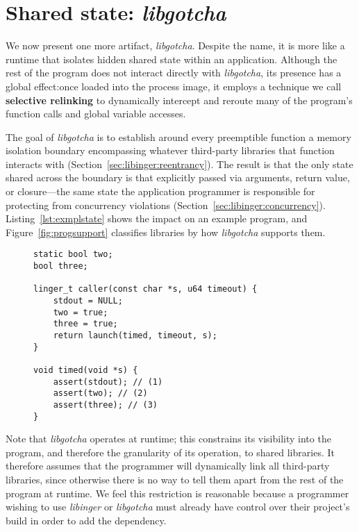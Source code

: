\section{Shared state: \textit{libgotcha}}
\label{sec:libgotcha}

We now present one more artifact, \textit{libgotcha}.
Despite the name, it is more like a runtime that isolates hidden shared state
within an application.  Although the rest of the
program does not interact directly with \textit{libgotcha}, its presence has a
global effect:\@ once loaded into the process image, it employs a technique we call
\textbf{selective relinking} to dynamically intercept and reroute many of the
program's function
calls and global variable accesses.

The goal of \textit{libgotcha} is to establish around every preemptible function a
memory isolation boundary encompassing whatever third-party libraries that function
interacts with (Section~\ref{sec:libinger:reentrancy}).  The result is that the only
state shared across the boundary is that explicitly passed via arguments,
return value, or closure---the same state the application programmer is responsible
for protecting from concurrency violations (Section~\ref{sec:libinger:concurrency}).
Listing~\ref{lst:exmplstate} shows the impact on an example program, and
Figure~\ref{fig:progsupport} classifies libraries by how \textit{libgotcha} supports
them.

\begin{figure}
\begin{lstlisting}[label=lst:exmplstate,caption=Demo of isolated \textnormal{(1)} vs.\ shared \textnormal{(2\&3)} state]
static bool two;
bool three;

linger_t caller(const char *s, u64 timeout) {
	stdout = NULL;
	two = true;
	three = true;
	return launch(timed, timeout, s);
}

void timed(void *s) {
	assert(stdout); // (1)
	assert(two); // (2)
	assert(three); // (3)
}
\end{lstlisting}
\end{figure}

Note that \textit{libgotcha} operates at runtime; this constrains its visibility
into the program, and therefore the granularity of its operation, to shared
libraries.  It therefore
assumes that the programmer will dynamically link all third-party libraries, since
otherwise there is no way to tell them apart from the rest of the program at runtime.
We feel this restriction is reasonable because a programmer wishing to use
\textit{libinger} or \textit{libgotcha} must already have control over their
project's build in order to add the dependency.

